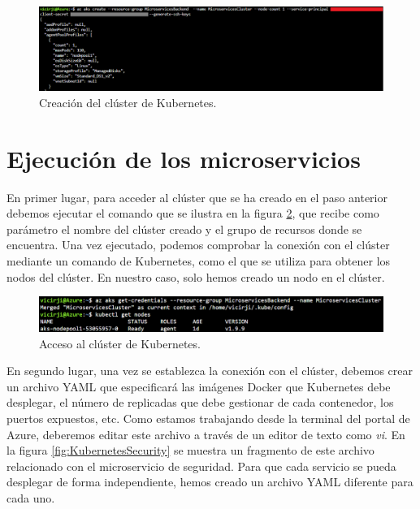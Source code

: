 \documentclass[11pt,spanish,listoffigures]{tfgetsinf}
\begin{document}
\begin{figure}[h]
\centering
\includegraphics[scale=0.5]{CreateCluster}
\caption{Creación del clúster de Kubernetes.}
\label{fig:CreateCluster}
\end{figure}

\section{Ejecución de los microservicios}


En primer lugar, para acceder al clúster que se ha creado en el paso anterior debemos ejecutar el comando que se ilustra en la figura \ref{fig:AccessCluster}, que recibe como parámetro el nombre del clúster creado y el grupo de recursos donde se encuentra. Una vez ejecutado, podemos comprobar la conexión con el clúster mediante un comando de Kubernetes, como el que se utiliza para obtener los nodos del clúster. En nuestro caso, solo hemos creado un nodo en el clúster.

\begin{figure}[h]
\centering
\includegraphics[scale=0.6]{AccessCluster}
\caption{Acceso al clúster de Kubernetes.}
\label{fig:AccessCluster}
\end{figure}

En segundo lugar, una vez se establezca la conexión con el clúster, debemos crear un archivo YAML que especificará las imágenes Docker que Kubernetes debe desplegar, el número de replicadas que debe gestionar de cada contenedor, los puertos expuestos, etc. Como estamos trabajando desde la terminal del portal de Azure, deberemos editar este archivo a través de un editor de texto como \textit{vi}. En la figura \ref{fig:KubernetesSecurity} se muestra un fragmento de este archivo relacionado con el microservicio de seguridad. Para que cada servicio se pueda desplegar de forma independiente, hemos creado un archivo YAML diferente para cada uno.
\end{document}
